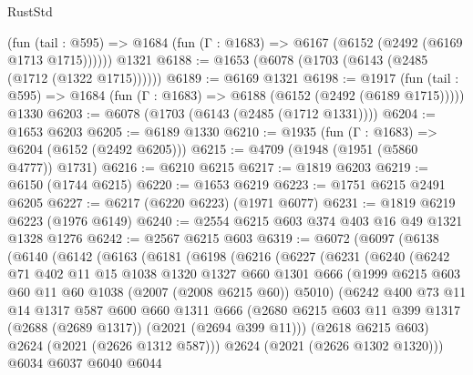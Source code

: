 \begin{lexlean}{RustStd}
\begin{coremodule}
      (fun (tail : @595) => @1684 (fun (Γ : @1683) => @6167 (@6152 (@2492 (@6169 @1713 @1715))))))
    @1321
@6188 := @1653 (@6078 (@1703 (@6143 (@2485 (@1712 (@1322 @1715))))))
@6189 := @6169 @1321
@6198 := @1917
    (fun (tail : @595) => @1684 (fun (Γ : @1683) => @6188 (@6152 (@2492 (@6189 @1715)))))
    @1330
@6203 := @6078 (@1703 (@6143 (@2485 (@1712 @1331))))
@6204 := @1653 @6203
@6205 := @6189 @1330
@6210 := @1935 (fun (Γ : @1683) => @6204 (@6152 (@2492 @6205)))
@6215 := @4709 (@1948 (@1951 (@5860 @4777)) @1731)
@6216 := @6210 @6215
@6217 := @1819 @6203
@6219 := @6150 (@1744 @6215)
@6220 := @1653 @6219
@6223 := @1751 @6215 @2491 @6205
@6227 := @6217 (@6220 @6223) (@1971 @6077)
@6231 := @1819 @6219 @6223 (@1976 @6149)
@6240 := @2554 @6215 @603 @374 @403 @16 @49 @1321 @1328 @1276
@6242 := @2567 @6215 @603
@6319 := @6072
    (@6097
      (@6138
        (@6140
          (@6142
            (@6163
              (@6181
                (@6198
                  (@6216
                    (@6227
                      (@6231
                        (@6240
                          (@6242
                            @71
                            @402
                            @11
                            @15
                            @1038
                            @1320
                            @1327
                            @660
                            @1301
                            @666
                            (@1999 @6215 @603 @60 @11 @60 @1038 (@2007 (@2008 @6215 @60)) @5010)
                            (@6242
                              @400
                              @73
                              @11
                              @14
                              @1317
                              @587
                              @600
                              @660
                              @1311
                              @666
                              (@2680
                                @6215
                                @603
                                @11
                                @399
                                @1317
                                (@2688 (@2689 @1317))
                                (@2021 (@2694 @399 @11)))
                              (@2618 @6215 @603)
                              @2624
                              (@2021 (@2626 @1312 @587)))
                            @2624
                            (@2021 (@2626 @1302 @1320)))
                          @6034
                          @6037
                          @6040
                          @6044

\end{coremodule}
\end{lexlean}
